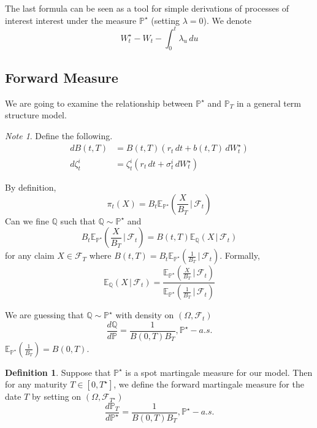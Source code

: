 \documentclass[10pt, oneside, reqno]{amsbook}
\theoremstyle{plain}%
\theoremstyle{definition}
\newtheorem{defn}[thm]{Definition}
\theoremstyle{remark}
\newtheorem*{note}{Note}
\newcommand{\given}{ \, | \,}
\newcommand{\sigf}{\mathcal{F}}
\newcommand{\Q}{\mathbb{Q}}
\newcommand{\E}{\mathbb{E}}
\renewcommand{\P}{\mathbb{P}}
\numberwithin{equation}{chapter}
\begin{document}
The last formula can be seen as a tool for simple derivations of processes of interest interest under the measure $\P^\star$ (setting $\lambda = 0$).  We denote \[
    W^\star_t - W_t - \int_0^t \lambda_u \, du
\] 

\subsection{Forward Measure} %
\label{sub:forward_measure}
We are going to examine the relationship between $\P^\star$ and $\P_T$ in a general term structure model.

\begin{note}
    Define the following.
    \begin{align*}
        dB(t, T) &= B(t, T) \left(r_t \, dt + b(t, T) \, dW^\star_t \right) \\
        d \zeta^i_t &= \zeta^i_t \left(r_t \, dt + \sigma^i_t \, dW^\star_t \right)
    \end{align*}
\end{note}

By definition, \[
    \pi_t(X) = B_t \E_{\P^\star} \left( \frac{X}{B_T} \given \sigf_t \right)
\]  Can we fine $\Q$ such that $\Q \sim \P^\star$ and \[
    B_t \E_{\P^\star} \left( \frac{X}{B_T} \given \sigf_t \right) = B(t, T) \E_\Q \left( X \given \sigf_t \right)
\] for any claim $X \in \sigf_T$ where $B(t, T) = B_t\E_{\P^\star} \left( \frac{1}{B_T} \given \sigf_t \right)$.  Formally, \[
    \E_{\Q} \left( X \given \sigf_t \right) = \frac{\E_{\P^\star} \left( \frac{X}{B_T} \given \sigf_t \right)}{\E_{\P^\star} \left( \frac{1}{B_T} \given \sigf_t \right)}
\]

We are guessing that $\Q \sim \P^\star$ with density on $(\Omega, \sigf_t)$ \[
    \frac{d\Q}{d \P} = \frac{1}{B(0, T) B_T}, \P^\star-a.s.
\]  $\E_{\P^\star} \left(\frac{1}{B_T} \right) = B(0, T)$.

\begin{defn}
    Suppose that $\P^\star$ is a spot martingale measure for our model.  Then for any maturity $T \in [0, T^\star]$, we define the forward martingale measure for the date $T$ by setting on $(\Omega, \sigf_{T^\star})$ \[
        \frac{d\P_T}{d\P^\star} = \frac{1}{B(0, T) B_T}, \P^\star-a.s.
    \]
\end{defn}
\end{document}
